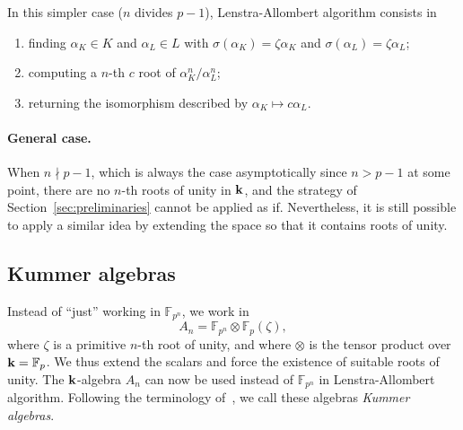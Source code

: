 In this simpler case ($n$ divides $p-1$), Lenstra-Allombert algorithm consists
in
\begin{enumerate}
  \item finding $\alpha_K\in K$ and $\alpha_L\in L$ with
    $\sigma(\alpha_K)=\zeta\alpha_K$ and $\sigma(\alpha_L)=\zeta\alpha_L$;
  \item computing a $n$-th $c$ root of $\alpha_K^n/\alpha_L^n$;
  \item returning the isomorphism described by $\alpha_K\mapsto c\alpha_L$.
\end{enumerate}

\paragraph{General case.} When $n\nmid p-1$, which is always
the case asymptotically since $n>p-1$ at some point, there are no $n$-th roots
of unity in $\mathbf{k}$, and the strategy of Section~\ref{sec:preliminaries} cannot be
applied as if. Nevertheless, it is still possible to apply a similar idea by
extending the space so that it contains roots of unity.

\subsection{Kummer algebras}
\label{sec:kummer-algebras}

%

Instead of ``just'' working in $\mathbb{F}_{p^n}$, we work in
\[
  A_n = \mathbb{F}_{p^n}\otimes \mathbb{F}_p(\zeta),
\]
where $\zeta$ is a primitive $n$-th root of unity, and where $\otimes$ is the tensor
product over $\mathbf{k}=\mathbb{F}_p$. We thus extend the scalars and force the existence of
suitable roots of unity. The $\mathbf{k}$-algebra $A_n$ can now be used instead of
$\mathbb{F}_{p^n}$ in Lenstra-Allombert algorithm. Following the terminology
of~\cite{DRR19}, we call these algebras \emph{Kummer algebras}.

